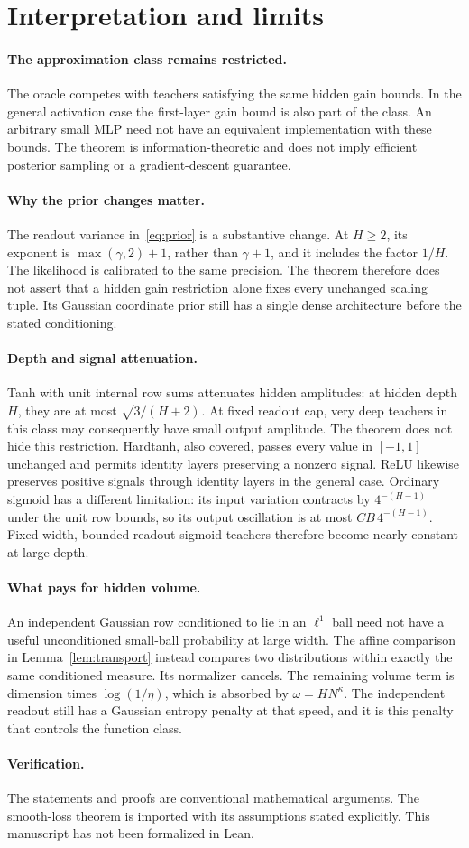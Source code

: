 \section{Interpretation and limits}
\paragraph{The approximation class remains restricted.}
The oracle competes with teachers satisfying the same hidden gain bounds. In the general activation case the first-layer gain bound is also part of the class. An arbitrary small MLP need not have an equivalent implementation with these bounds. The theorem is information-theoretic and does not imply efficient posterior sampling or a gradient-descent guarantee.

\paragraph{Why the prior changes matter.}
The readout variance in~\eqref{eq:prior} is a substantive change. At $H\ge2$, its exponent is $\max(\gamma,2)+1$, rather than $\gamma+1$, and it includes the factor $1/H$. The likelihood is calibrated to the same precision. The theorem therefore does not assert that a hidden gain restriction alone fixes every unchanged scaling tuple. Its Gaussian coordinate prior still has a single dense architecture before the stated conditioning.

\paragraph{Depth and signal attenuation.}
Tanh with unit internal row sums attenuates hidden amplitudes: at hidden depth $H$, they are at most $\sqrt{3/(H+2)}$. At fixed readout cap, very deep teachers in this class may consequently have small output amplitude. The theorem does not hide this restriction. Hardtanh, also covered, passes every value in $[-1,1]$ unchanged and permits identity layers preserving a nonzero signal. ReLU likewise preserves positive signals through identity layers in the general case. Ordinary sigmoid has a different limitation: its input variation contracts by $4^{-(H-1)}$ under the unit row bounds, so its output oscillation is at most $CB\,4^{-(H-1)}$. Fixed-width, bounded-readout sigmoid teachers therefore become nearly constant at large depth.

\paragraph{What pays for hidden volume.}
An independent Gaussian row conditioned to lie in an $\ell^1$ ball need not have a useful unconditioned small-ball probability at large width. The affine comparison in Lemma~\ref{lem:transport} instead compares two distributions within exactly the same conditioned measure. Its normalizer cancels. The remaining volume term is dimension times $\log(1/\eta)$, which is absorbed by $\omega=HN^\kappa$. The independent readout still has a Gaussian entropy penalty at that speed, and it is this penalty that controls the function class.

\paragraph{Verification.}
The statements and proofs are conventional mathematical arguments. The smooth-loss theorem is imported with its assumptions stated explicitly. This manuscript has not been formalized in Lean.
